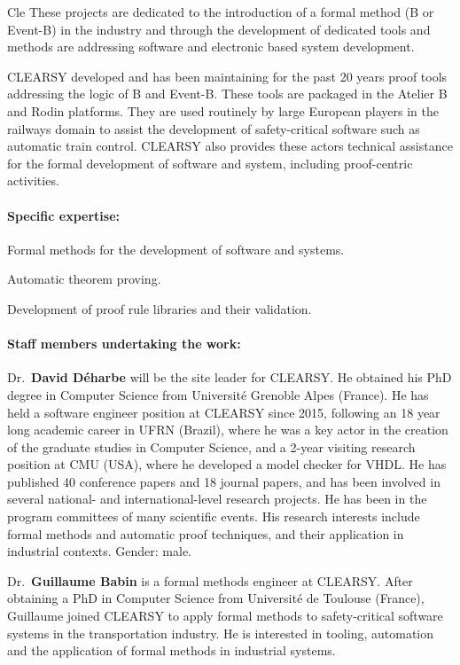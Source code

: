\begin{sitedescription}{Cle}
These projects are dedicated to the introduction of a formal method (B or Event-B) in the industry and through the development
of dedicated tools and methods are addressing software and electronic based system development.

CLEARSY developed and has been maintaining for the past 20 years proof tools addressing the logic of B and Event-B. These tools are 
packaged in the Atelier B and Rodin platforms. They are used routinely by large European players in the railways domain to assist the
development of safety-critical software such as automatic train control. CLEARSY also provides these actors technical assistance for the formal development of software and system, including proof-centric activities. 

\paragraph{Specific expertise:}

\begin{compactitem}
\item Formal methods for the development of software and systems.
\item Automatic theorem proving.
\item Development of proof rule libraries and their validation.
\end{compactitem}

\paragraph{Staff members undertaking the work:}

Dr.\ \textbf{David Déharbe} will be the site leader for CLEARSY. He obtained his PhD degree in Computer Science from Université Grenoble Alpes 
(France). He has held a software engineer position at CLEARSY since 2015, following an 18 year long academic career in UFRN (Brazil), 
where he was a key actor in the creation of the graduate studies in Computer Science, and a 2-year visiting research position at CMU 
(USA), where he developed a model checker for VHDL. He has published 40 conference papers and 18 journal papers, and has been involved 
in several national- and international-level research projects. He has been in the program committees of many scientific events. His 
research interests include formal methods and automatic proof techniques, and their application in industrial contexts. Gender: male.

Dr.\ \textbf{Guillaume Babin} is a formal methods engineer at CLEARSY. After obtaining a PhD in Computer Science from Université de 
Toulouse (France), Guillaume joined CLEARSY to apply formal methods to safety-critical software systems in the transportation industry. 
He is interested in tooling, automation and the application of formal methods in industrial systems.


\end{sitedescription}
